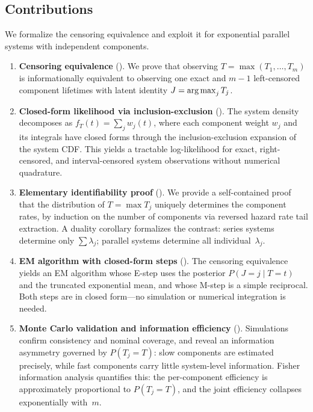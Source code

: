 \subsection*{Contributions}

We formalize the censoring equivalence and exploit it for exponential
parallel systems with independent components.

\begin{enumerate}
  \item \textbf{Censoring equivalence} ().
    We prove that observing $T = \max(T_1, \ldots, T_m)$ is
    informationally equivalent to observing one exact and $m-1$
    left-censored component lifetimes with latent identity $J =
    \operatorname*{arg\,max}_j T_j$.

  \item \textbf{Closed-form likelihood via inclusion-exclusion}
    ().
    The system density decomposes as $f_T(t) = \sum_j w_j(t)$, where
    each component weight $w_j$ and its integrals have closed forms
    through the inclusion-exclusion expansion of the system CDF.
    This yields a tractable log-likelihood for exact, right-censored,
    and interval-censored system observations without numerical
    quadrature.

  \item \textbf{Elementary identifiability proof}
    ().
    We provide a self-contained proof that the distribution of
    $T = \max T_j$ uniquely determines the component rates, by
    induction on the number of components via reversed hazard rate
    tail extraction.  A duality corollary formalizes the contrast:
    series systems determine only $\sum \lambda_j$; parallel systems
    determine all individual~$\lambda_j$.

  \item \textbf{EM algorithm with closed-form steps}
    ().
    The censoring equivalence yields an EM algorithm whose E-step
    uses the posterior $P(J = j \mid T = t)$ and the truncated
    exponential mean, and whose M-step is a simple reciprocal.
    Both steps are in closed form---no simulation or numerical
    integration is needed.

  \item \textbf{Monte Carlo validation and information efficiency}
    ().
    Simulations confirm consistency and nominal coverage, and reveal
    an information asymmetry governed by $P(T_j = T)$: slow components
    are estimated precisely, while fast components carry little
    system-level information.  Fisher information analysis
    quantifies this: the per-component efficiency is approximately
    proportional to $P(T_j = T)$, and the joint efficiency
    collapses exponentially with~$m$.


\end{enumerate}
